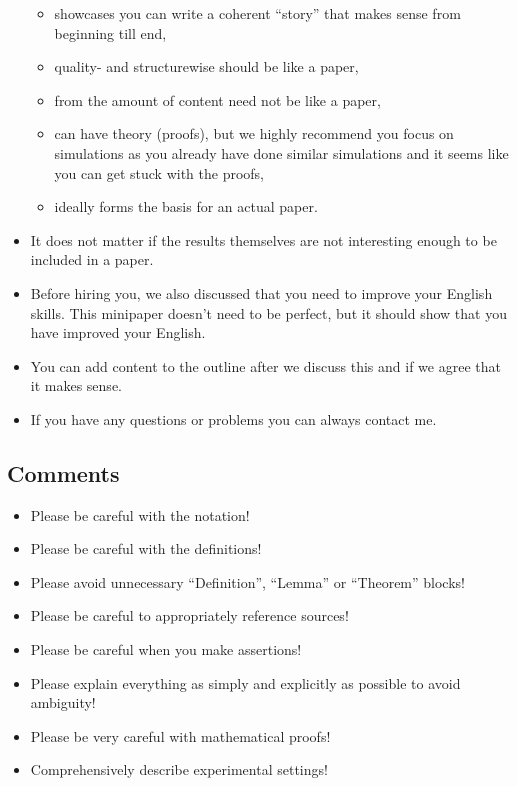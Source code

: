 \begin{itemize}
  \begin{itemize}
  \tightlist
  \item
    showcases you can write a coherent ``story'' that makes sense from
    beginning till end,
  \item
    quality- and structurewise should be like a paper,
  \item
    from the amount of content need not be like a paper,
  \item
    can have theory (proofs), but we highly recommend you focus on
    simulations as you already have done similar simulations and it
    seems like you can get stuck with the proofs,
  \item
    ideally forms the basis for an actual paper.
  \end{itemize}
\item
  It does not matter if the results themselves are not interesting
  enough to be included in a paper.
\item
  Before hiring you, we also discussed that you need to improve your
  English skills. This minipaper doesn't need to be perfect, but it
  should show that you have improved your English.
\item
  You can add content to the outline after we discuss this and if we
  agree that it makes sense.
\item
  If you have any questions or problems you can always contact me.
\end{itemize}

\hypertarget{comments}{%
\subsection{Comments}\label{comments}}

\begin{itemize}
\tightlist
\item
  Please be careful with the notation!
\item
  Please be careful with the definitions!
\item
  Please avoid unnecessary ``Definition'', ``Lemma'' or ``Theorem''
  blocks!
\item
  Please be careful to appropriately reference sources!
\item
  Please be careful when you make assertions!
\item
  Please explain everything as simply and explicitly as possible to
  avoid ambiguity!
\item
  Please be very careful with mathematical proofs!
\item
  Comprehensively describe experimental settings!
\end{itemize}

